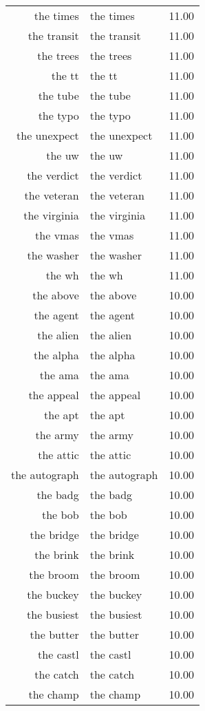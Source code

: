 \begin{table}[ht]
\begin{tabular}{rlr}
  the times & the times & 11.00 \\ 
  the transit & the transit & 11.00 \\ 
  the trees & the trees & 11.00 \\ 
  the tt & the tt & 11.00 \\ 
  the tube & the tube & 11.00 \\ 
  the typo & the typo & 11.00 \\ 
  the unexpect & the unexpect & 11.00 \\ 
  the uw & the uw & 11.00 \\ 
  the verdict & the verdict & 11.00 \\ 
  the veteran & the veteran & 11.00 \\ 
  the virginia & the virginia & 11.00 \\ 
  the vmas & the vmas & 11.00 \\ 
  the washer & the washer & 11.00 \\ 
  the wh & the wh & 11.00 \\ 
  the above & the above & 10.00 \\ 
  the agent & the agent & 10.00 \\ 
  the alien & the alien & 10.00 \\ 
  the alpha & the alpha & 10.00 \\ 
  the ama & the ama & 10.00 \\ 
  the appeal & the appeal & 10.00 \\ 
  the apt & the apt & 10.00 \\ 
  the army & the army & 10.00 \\ 
  the attic & the attic & 10.00 \\ 
  the autograph & the autograph & 10.00 \\ 
  the badg & the badg & 10.00 \\ 
  the bob & the bob & 10.00 \\ 
  the bridge & the bridge & 10.00 \\ 
  the brink & the brink & 10.00 \\ 
  the broom & the broom & 10.00 \\ 
  the buckey & the buckey & 10.00 \\ 
  the busiest & the busiest & 10.00 \\ 
  the butter & the butter & 10.00 \\ 
  the castl & the castl & 10.00 \\ 
  the catch & the catch & 10.00 \\ 
  the champ & the champ & 10.00 \\ 

\end{tabular}
\end{table}

